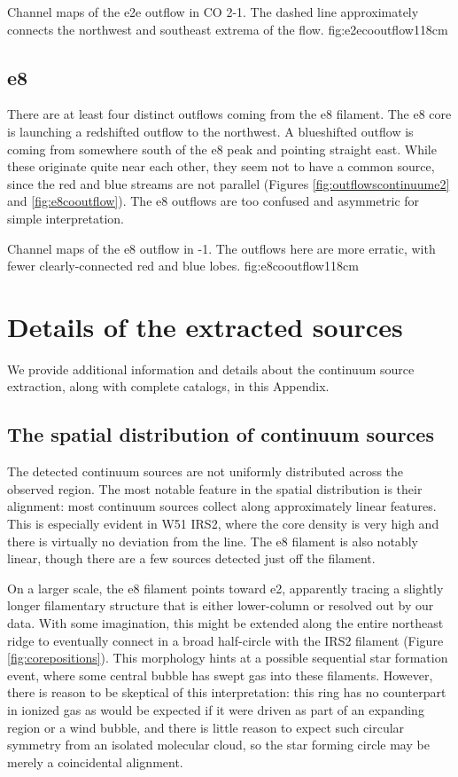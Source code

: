 \documentclass{emulateapj}
\begin{document}
{Channel maps of the e2e outflow in CO 2-1.  The dashed line approximately
connects the northwest and southeast extrema of the flow.}
{fig:e2ecooutflow}{1}{18cm}

\subsection{e8}
There are at least four distinct outflows coming from the e8 filament.
The e8 core is launching a redshifted outflow to the northwest.  A blueshifted
outflow is coming from somewhere south of the e8 peak and pointing straight
east.  While these originate quite near each other, they seem not to have
a common source, since the red and blue streams are not parallel (Figures
\ref{fig:outflowscontinuume2} and \ref{fig:e8cooutflow}).  The e8 outflows are too
confused and asymmetric for simple interpretation.


{Channel maps of the e8 outflow in -1.  The outflows here are more
erratic, with fewer clearly-connected red and blue lobes.}
{fig:e8cooutflow}{1}{18cm}

\section{Details of the extracted sources}
\label{sec:contsrcs}
We provide additional information and details about the continuum
source extraction, along with complete catalogs, in this Appendix.

\subsection{The spatial distribution of continuum sources}
\label{sec:corespatialdistribution}
The detected continuum sources are not uniformly distributed across the
observed region.  The most notable feature in the spatial distribution is their
alignment: most continuum sources collect along approximately linear features.
This is especially evident in W51 IRS2, where the core density is very high and
there is virtually no deviation from the line.  The e8 filament is also notably
linear, though there are a few sources detected just off the filament. 

On a larger scale, the e8 filament points toward e2, apparently tracing a
slightly longer filamentary structure that is either lower-column or resolved
out by our data.  With some imagination, this might be extended along the
entire northeast ridge to eventually connect in a broad half-circle with the
IRS2 filament (Figure \ref{fig:corepositions}).  This morphology hints at a
possible sequential star formation event, where some central bubble has swept
gas into these filaments.  However, there is reason to be skeptical of this
interpretation: this ring has no counterpart in ionized gas as would be
expected if it were driven as part of an expanding \hii region or a wind
bubble, and there is little reason to expect such circular symmetry from an
isolated molecular cloud, so the star forming circle may be merely a
coincidental alignment.
\end{document}
